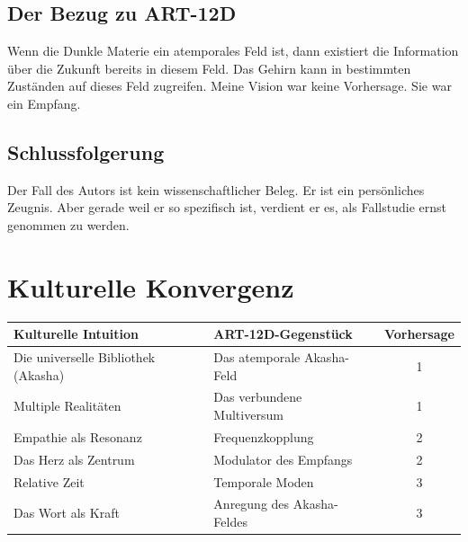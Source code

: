 \subsection{Der Bezug zu ART-12D}
Wenn die Dunkle Materie ein atemporales Feld ist, dann existiert die Information über die Zukunft bereits in diesem Feld. Das Gehirn kann in bestimmten Zuständen auf dieses Feld zugreifen. Meine Vision war keine Vorhersage. Sie war ein Empfang.

\subsection{Schlussfolgerung}
Der Fall des Autors ist kein wissenschaftlicher Beleg. Er ist ein persönliches Zeugnis. Aber gerade weil er so spezifisch ist, verdient er es, als Fallstudie ernst genommen zu werden.

\section{Kulturelle Konvergenz}
\begin{table}[H]
\centering
\begin{tabular}{@{}llc@{}}
\toprule
\textbf{Kulturelle Intuition} & \textbf{ART-12D-Gegenstück} & \textbf{Vorhersage} \\ \midrule
Die universelle Bibliothek (Akasha) & Das atemporale Akasha-Feld & 1 \\
Multiple Realitäten & Das verbundene Multiversum & 1 \\
Empathie als Resonanz & Frequenzkopplung & 2 \\
Das Herz als Zentrum & Modulator des Empfangs & 2 \\
Relative Zeit & Temporale Moden & 3 \\
Das Wort als Kraft & Anregung des Akasha-Feldes & 3 \\ \bottomrule
\end{tabular}
\end{table}

\newpage
